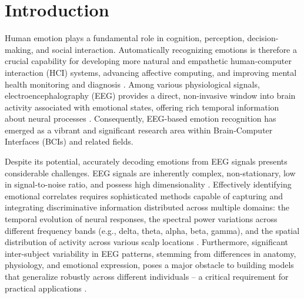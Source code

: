 \documentclass[runningheads]{llncs}
\begin{document}
\section{Introduction}

\label{sec:introduction}



Human emotion plays a fundamental role in cognition, perception, decision-making, and social interaction. Automatically recognizing emotions is therefore a crucial capability for developing more natural and empathetic human-computer interaction (HCI) systems, advancing affective computing, and improving mental health monitoring and diagnosis \cite{cite_review_affective_computing}. Among various physiological signals, electroencephalography (EEG) provides a direct, non-invasive window into brain activity associated with emotional states, offering rich temporal information about neural processes \cite{cite_eeg_review}. Consequently, EEG-based emotion recognition has emerged as a vibrant and significant research area within Brain-Computer Interfaces (BCIs) and related fields.



Despite its potential, accurately decoding emotions from EEG signals presents considerable challenges. EEG signals are inherently complex, non-stationary, low in signal-to-noise ratio, and possess high dimensionality \cite{cite_eeg_challenges}. Effectively identifying emotional correlates requires sophisticated methods capable of capturing and integrating discriminative information distributed across multiple domains: the temporal evolution of neural responses, the spectral power variations across different frequency bands (e.g., delta, theta, alpha, beta, gamma), and the spatial distribution of activity across various scalp locations \cite{cite_TSS_importance}. Furthermore, significant inter-subject variability in EEG patterns, stemming from differences in anatomy, physiology, and emotional expression, poses a major obstacle to building models that generalize robustly across different individuals – a critical requirement for practical applications \cite{cite_cross_subject_challenge}.
\end{document}
